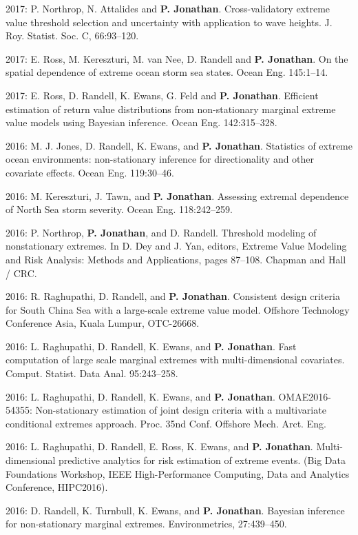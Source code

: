 \documentclass[11pt,a4paper]{moderncv}
\begin{document}
2017: P. Northrop, N. Attalides and \textbf{P. Jonathan}. Cross-validatory extreme value threshold selection and uncertainty with application to wave heights. J. Roy. Statist. Soc. C, 66:93--120.

2017: E. Ross, M. Kereszturi, M. van Nee, D. Randell and \textbf{P. Jonathan}. On the spatial dependence of extreme ocean storm sea states. Ocean Eng. 145:1--14.

2017: E. Ross, D. Randell, K. Ewans, G. Feld and \textbf{P. Jonathan}. Efficient estimation of return value distributions from non-stationary marginal extreme value models using Bayesian inference. Ocean Eng. 142:315--328.

2016: M. J. Jones, D. Randell, K. Ewans, and \textbf{P. Jonathan}. Statistics of extreme ocean environments: non-stationary inference for directionality and other covariate effects. Ocean Eng. 119:30--46.

2016: M. Kereszturi, J. Tawn, and \textbf{P. Jonathan}. Assessing extremal dependence of North Sea storm severity. Ocean Eng. 118:242--259.

2016: P. Northrop, \textbf{P. Jonathan}, and D. Randell. Threshold modeling of nonstationary extremes. In D. Dey and J. Yan, editors, Extreme Value Modeling and Risk Analysis: Methods and Applications, pages 87--108. Chapman and Hall / CRC.

2016: R. Raghupathi, D. Randell, and \textbf{P. Jonathan}. Consistent design criteria for South China Sea with a large-scale extreme value model. Offshore Technology Conference Asia, Kuala Lumpur, OTC-26668.

2016: L. Raghupathi, D. Randell, K. Ewans, and \textbf{P. Jonathan}. Fast computation of large scale marginal extremes with multi-dimensional covariates. Comput. Statist. Data Anal. 95:243--258.

2016: L. Raghupathi, D. Randell, K. Ewans, and \textbf{P. Jonathan}. OMAE2016-54355: Non-stationary estimation of joint design criteria with a multivariate conditional extremes approach. Proc. 35nd Conf. Offshore Mech. Arct. Eng.

2016: L. Raghupathi, D. Randell, E. Ross, K. Ewans, and \textbf{P. Jonathan}. Multi-dimensional predictive analytics for risk estimation of extreme events. (Big Data Foundations Workshop, IEEE High-Performance Computing, Data and Analytics Conference, HIPC2016).

2016: D. Randell, K. Turnbull, K. Ewans, and \textbf{P. Jonathan}. Bayesian inference for non-stationary marginal extremes. Environmetrics, 27:439--450.
\end{document}
